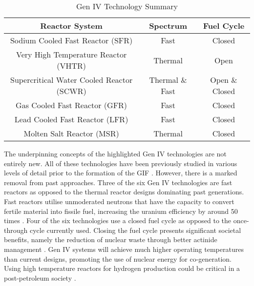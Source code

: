 \documentclass[journal]{IEEEtran}
\begin{document}
\begin{table}[!t]
\renewcommand{\arraystretch}{1.3}
\caption{Gen IV Technology Summary \cite{GenIVRoadmap, Marques2010a}}
\label{table:GenIV}
\centering
\begin{tabular}{|c|c|c|}
\hline
\textbf{Reactor System} & \textbf{Spectrum} & \textbf{Fuel Cycle}\\
\hline
Sodium Cooled Fast Reactor (SFR) & Fast & Closed \\
\hline
Very High Temperature Reactor (VHTR) & Thermal & Open \\
\hline
Supercritical Water Cooled Reactor (SCWR) & Thermal \& Fast & Open \& Closed \\
\hline
Gas Cooled Fast Reactor (GFR) & Fast & Closed \\
\hline
Lead Cooled Fast Reactor (LFR) & Fast & Closed \\
\hline
Molten Salt Reactor (MSR) & Thermal & Closed \\
\hline

\end{tabular}
\end{table}

The underpinning concepts of the highlighted Gen IV technologies are not entirely new. 
All of these technologies have been previously studied in various levels of detail prior to the formation of the GIF \cite{Marques2010a}. However, there is a marked removal from past approaches. 
Three of the six Gen IV technologies are fast reactors as opposed to the thermal reactor designs dominating past generations.
Fast reactors utilise unmoderated neutrons that have the capacity to convert fertile material into fissile fuel, increasing the uranium efficiency by around 50 times \cite{Locatelli2013}. 
Four of the six technologies use a closed fuel cycle as opposed to the once-through cycle currently used. 
Closing the fuel cycle presents significant societal benefits, namely the reduction of nuclear waste through better actinide management \cite{GenIVRoadmap, Bhatnagar2011}. 
Gen IV systems will achieve much  higher operating temperatures than current designs, promoting the use of nuclear energy for co-generation. 
Using high temperature reactors for hydrogen production could be critical in a post-petroleum society \cite{ Bhatnagar2011}. 
\end{document}
